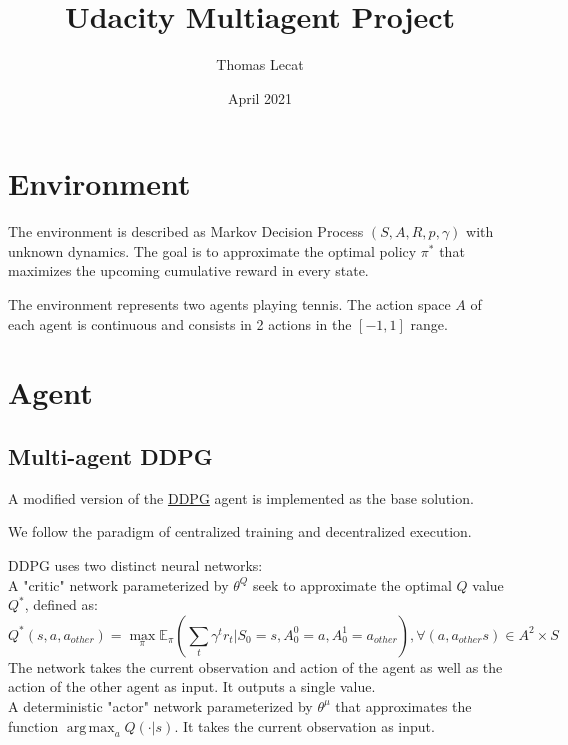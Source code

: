 \documentclass{article}
\title{Udacity Multiagent Project}
\author{Thomas Lecat}
\date{April 2021}
\DeclareMathOperator*{\argmax}{arg\,max}
\begin{document}
    \maketitle


    \section{Environment}\label{sec:environment}

    The environment is described as Markov Decision Process $(S, A, R, p, \gamma)$ with unknown dynamics.
    The goal is to approximate the optimal policy $\pi^*$ that maximizes the upcoming cumulative reward in every state.

    The environment represents two agents playing tennis.
    The action space $A$ of each agent is continuous and consists in 2 actions in the $[-1, 1]$ range.


    \section{Agent}\label{sec:agent}

    \subsection{Multi-agent DDPG}\label{subsec:ddpg}


    A modified version of the \href{https://arxiv.org/abs/1509.02971}{DDPG} agent is implemented as the base solution.

    We follow the paradigm of centralized training and decentralized execution.

    DDPG uses two distinct neural networks: \\

    A "critic" network parameterized by $\theta^Q$ seek to approximate the optimal $Q$ value $Q^*$, defined as:
    \[
        Q^*(s, a, a_{other}) = \max_{\pi} \mathbb{E}_{\pi} (\sum_{t} \gamma^t r_t | S_0=s, A^0_0=a, A^1_0=a_{other}),  \forall (a, a_{other} s) \in A^2 \times S
    \]
    The network takes the current observation and action of the agent as well as the action of the other agent as input. It outputs a single value.\\

    A deterministic "actor" network parameterized by $\theta^\mu$ that approximates the function $\argmax_a{Q(\cdot|s)}$.
    It takes the current observation as input.\\
\end{document}
